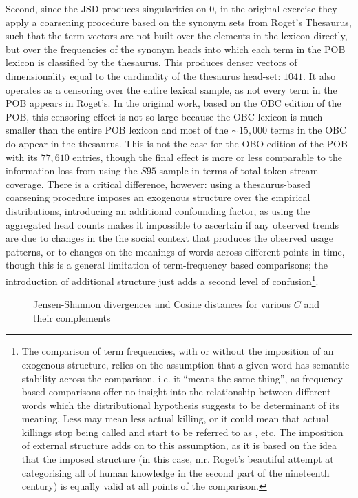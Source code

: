Second, since the JSD produces singularities on $0$, in the original exercise they apply a coarsening procedure based on the synonym sets from Roget's Thesaurus, such that the term-vectors are not built over the elements in the lexicon directly, but over the frequencies of the synonym heads into which each term in the POB lexicon is classified by the thesaurus.
This produces denser vectors of dimensionality equal to the cardinality of the thesaurus head-set: $1041$.
It also operates as a censoring over the entire lexical sample, as not every term in the POB appears in Roget's.
In the original work, based on the OBC edition of the POB, this censoring effect is not so large because the OBC lexicon is much smaller than the entire POB lexicon and most of the $\sim 15,000$ terms in the OBC do appear in the thesaurus.
This is not the case for the OBO edition of the POB with its $77,610$ entries, though the final effect is more or less comparable to the information loss from using the $S95$ sample in terms of total token-stream coverage.
There is a critical difference, however: using a thesaurus-based coarsening procedure imposes an exogenous structure over the empirical distributions, introducing an additional confounding factor, as using the aggregated head counts makes it impossible to ascertain if any observed trends are due to changes in the the social context that produces the observed usage patterns, or to changes on the meanings of words across different points in time, though this is a general limitation of term-frequency based comparisons; the introduction of additional structure just adds a second level of confusion\footnote{
    \label{foot:semstat}
    The comparison of term frequencies, with or without the imposition of an exogenous structure, relies on the assumption that a given word has semantic stability across the comparison, i.e. it ``means the same thing'', as frequency based comparisons offer no insight into the relationship between different words which the distributional hypothesis suggests to be determinant of its meaning.
    Less  may mean less actual killing, or it could mean that actual killings stop being called  and start to be referred to as , etc.
    The imposition of external structure adds on to this assumption, as it is based on the idea that the imposed structure (in this case, mr. Roget's beautiful attempt at categorising all of human knowledge in the second part of the nineteenth century) is equally valid at all points of the comparison.
}.

\begin{figure}
    \centerfloat
    
    \caption[Divergence measures for various $C$ and their complements]{
        Jensen-Shannon divergences and Cosine distances for various $C$ and their complements
    }
    \label{fig:klingenstein}
\end{figure}


